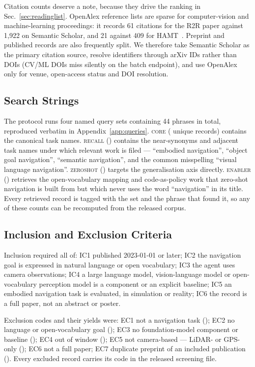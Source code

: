 \documentclass[journal]{IEEEtran}
\begin{document}
Citation counts deserve a note, because they drive the ranking in
Sec.~\ref{sec:readinglist}. OpenAlex reference lists are sparse for
computer-vision and machine-learning proceedings: it records 61 citations
for the R2R paper against 1{,}922 on Semantic Scholar, and 21 against 409
for HAMT~\cite{chen2021history}. Preprint and published records are also
frequently split. We therefore take Semantic Scholar as the primary
citation source, resolve identifiers through arXiv IDs rather than DOIs
(CV/ML DOIs miss silently on the batch endpoint), and use OpenAlex only for
venue, open-access status and DOI resolution.

\subsection{Search Strings}\label{sec:strings}
The protocol runs four named query sets containing 44 phrases in total,
reproduced verbatim in Appendix~\ref{app:queries}. \textsc{core}
(\SetCore{} unique records) contains the canonical task names.
\textsc{recall} (\SetRecall{}) contains the near-synonyms and adjacent task
names under which relevant work is filed --- ``embodied navigation'',
``object goal navigation'', ``semantic navigation'', and the common
misspelling ``visual language navigation''. \textsc{zeroshot}
(\SetZeroshot{}) targets the generalisation axis directly. \textsc{enabler}
(\SetEnabler{}) retrieves the open-vocabulary mapping and code-as-policy
work that zero-shot navigation is built from but which never uses the word
``navigation'' in its title. Every retrieved record is tagged with the set
and the phrase that found it, so any of these counts can be recomputed from
the released corpus.

\subsection{Inclusion and Exclusion Criteria}
Inclusion required all of: IC1 published 2023-01-01 or later; IC2 the
navigation goal is expressed in natural language or open vocabulary; IC3
the agent uses camera observations; IC4 a large language model,
vision-language model or open-vocabulary perception model is a component or
an explicit baseline; IC5 an embodied navigation task is evaluated, in
simulation or reality; IC6 the record is a full paper, not an abstract or
poster.

Exclusion codes and their yields were: EC1 not a navigation task
(\ScrECOne{}); EC2 no language or open-vocabulary goal (\ScrECTwo{}); EC3
no foundation-model component or baseline (\ScrECThree{}); EC4 out of
window (\ScrECFour{}); EC5 not camera-based --- LiDAR- or GPS-only
(\ScrECFive{}); EC6 not a full paper; EC7 duplicate preprint of an included
publication (\ScrECSeven{}). Every excluded record carries its code in the
released screening file.
\end{document}
